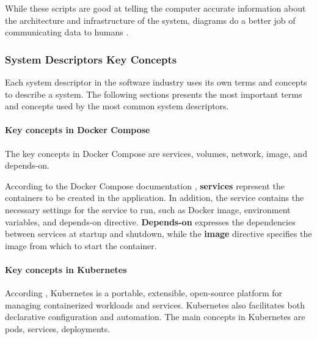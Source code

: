 \documentclass[sigconf]{acmart}
\begin{document}
While these scripts are good at telling the computer accurate information about the architecture and infrastructure of the system, diagrams do a better job of communicating data to humans \citep{flaatten2020}.

\subsubsection{System Descriptors Key Concepts}
\label{sec:key-concepts}

Each system descriptor in the software industry uses its own terms and concepts to describe a system. The following sections presents the most important terms and concepts used by the most common system descriptors.

\paragraph{\textbf{Key concepts in Docker Compose}}

The key concepts in Docker Compose are services, volumes, network, image, and depends-on.

According to the Docker Compose documentation \citep{dockercompose2019}, \textbf{services} represent the containers to be created in the application. In addition, the service contains the necessary settings for the service to run, such as Docker image, environment variables, and depends-on directive. \textbf{Depends-on} expresses the dependencies between services at startup and shutdown, while the \textbf{image} directive specifies the image from which to start the container.



\paragraph{\textbf{Key concepts in Kubernetes}}

According \cite{kubernetes2020}, Kubernetes is a portable, extensible, open-source platform for managing containerized workloads and services. Kubernetes also facilitates both declarative configuration and automation. The main concepts in Kubernetes are pods, services, deployments.
\end{document}
